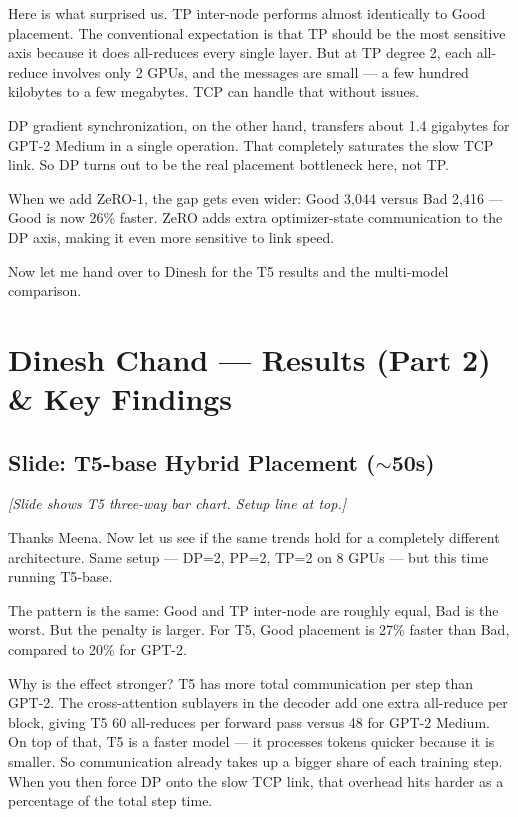 \documentclass[11pt, a4paper]{article}
\begin{document}
Here is what surprised us. TP inter-node performs almost identically to Good placement. The conventional expectation is that TP should be the most sensitive axis because it does all-reduces every single layer. But at TP degree 2, each all-reduce involves only 2 GPUs, and the messages are small --- a few hundred kilobytes to a few megabytes. TCP can handle that without issues.

DP gradient synchronization, on the other hand, transfers about 1.4 gigabytes for GPT-2 Medium in a single operation. That completely saturates the slow TCP link. So DP turns out to be the real placement bottleneck here, not TP.

When we add ZeRO-1, the gap gets even wider: Good 3,044 versus Bad 2,416 --- Good is now 26\% faster. ZeRO adds extra optimizer-state communication to the DP axis, making it even more sensitive to link speed.

Now let me hand over to Dinesh for the T5 results and the multi-model comparison.

\section{Dinesh Chand --- Results (Part 2) \& Key Findings}

\subsection{Slide: T5-base Hybrid Placement ($\sim$50s)}
\textit{[Slide shows T5 three-way bar chart. Setup line at top.]}

Thanks Meena. Now let us see if the same trends hold for a completely different architecture. Same setup --- DP=2, PP=2, TP=2 on 8 GPUs --- but this time running T5-base.

The pattern is the same: Good and TP inter-node are roughly equal, Bad is the worst. But the penalty is larger. For T5, Good placement is 27\% faster than Bad, compared to 20\% for GPT-2.

Why is the effect stronger? T5 has more total communication per step than GPT-2. The cross-attention sublayers in the decoder add one extra all-reduce per block, giving T5 60 all-reduces per forward pass versus 48 for GPT-2 Medium. On top of that, T5 is a faster model --- it processes tokens quicker because it is smaller. So communication already takes up a bigger share of each training step. When you then force DP onto the slow TCP link, that overhead hits harder as a percentage of the total step time.
\end{document}
